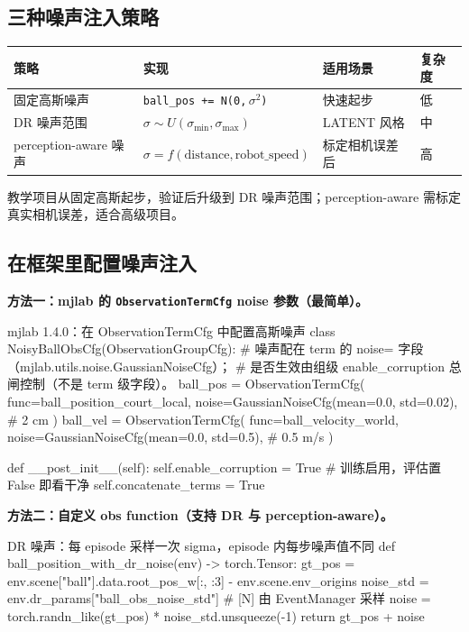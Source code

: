 \subsection{三种噪声注入策略}

\begin{center}
\small
\begin{tabular}{@{}llll@{}}
\toprule
策略 & 实现 & 适用场景 & 复杂度 \\
\midrule
固定高斯噪声 & \texttt{ball\_pos += N(0,$\,\sigma^2$)} & 快速起步 & 低 \\
DR 噪声范围 & $\sigma\sim U(\sigma_{\min},\sigma_{\max})$ & LATENT 风格 & 中 \\
perception-aware 噪声 & $\sigma=f(\text{distance},\text{robot\_speed})$ & 标定相机误差后 & 高 \\
\bottomrule
\end{tabular}
\end{center}

教学项目从固定高斯起步，验证后升级到 DR 噪声范围；perception-aware 需标定真实相机误差，适合高级项目。

\subsection{在框架里配置噪声注入}

\textbf{方法一：mjlab 的 \texttt{ObservationTermCfg} noise 参数（最简单）。}

\begin{codebox}[Python]{mjlab 1.4.0：在 ObservationTermCfg 中配置高斯噪声}
class NoisyBallObsCfg(ObservationGroupCfg):
    # 噪声配在 term 的 noise= 字段（mjlab.utils.noise.GaussianNoiseCfg）；
    # 是否生效由组级 enable_corruption 总闸控制（不是 term 级字段）。
    ball_pos = ObservationTermCfg(
        func=ball_position_court_local,
        noise=GaussianNoiseCfg(mean=0.0, std=0.02),  # 2 cm
    )
    ball_vel = ObservationTermCfg(
        func=ball_velocity_world,
        noise=GaussianNoiseCfg(mean=0.0, std=0.5),   # 0.5 m/s
    )

    def __post_init__(self):
        self.enable_corruption = True    # 训练启用，评估置 False 即看干净
        self.concatenate_terms = True
\end{codebox}

\textbf{方法二：自定义 obs function（支持 DR 与 perception-aware）。}

\begin{codebox}[Python]{DR 噪声：每 episode 采样一次 sigma，episode 内每步噪声值不同}
def ball_position_with_dr_noise(env) -> torch.Tensor:
    gt_pos = env.scene["ball"].data.root_pos_w[:, :3] - env.scene.env_origins
    noise_std = env.dr_params["ball_obs_noise_std"]   # [N] 由 EventManager 采样
    noise = torch.randn_like(gt_pos) * noise_std.unsqueeze(-1)
    return gt_pos + noise
\end{codebox}

